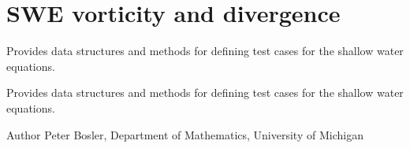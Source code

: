 \hypertarget{group___s_w_e_vorticity_and_divergence}{\section{S\+W\+E vorticity and divergence}
\label{group___s_w_e_vorticity_and_divergence}
}


Provides data structures and methods for defining test cases for the shallow water equations.  


Provides data structures and methods for defining test cases for the shallow water equations. 

\begin{DoxyAuthor}{Author}
Peter Bosler, Department of Mathematics, University of Michigan 
\end{DoxyAuthor}
